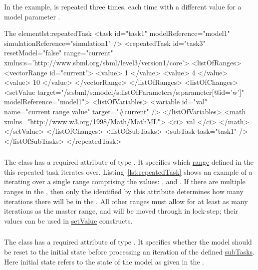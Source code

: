 In the example,  is repeated three times, each time with a different value for a model parameter .
\begin{myXmlLst}{The  element}{lst:repeatedTask}
<task id="task1" modelReference="model1" simulationReference="simulation1" />
<repeatedTask id="task3" resetModel="false" range="current"
    xmlns:s='http://www.sbml.org/sbml/level3/version1/core'>
  <listOfRanges>
    <vectorRange id="current"> 
        <value> 1 </value> 
        <value> 4 </value> 
        <value> 10 </value> 
    </vectorRange> 
  </listOfRanges>
  <listOfChanges>
     <setValue target="/s:sbml/s:model/s:listOfParameters/s:parameter[@id='w']" modelReference="model1">
       <listOfVariables> 
         <variable id="val" name="current range value" target="#current" /> 
       </listOfVariables> 
       <math xmlns="http://www.w3.org/1998/Math/MathML"> 
         <ci> val </ci> 
       </math> 
     </setValue> 
  </listOfChanges>
  <listOfSubTasks>
    <subTask task="task1" />
  </listOfSubTasks>
</repeatedTask>
\end{myXmlLst}
 
\subsubsection{}
\label{sec:rangeAttribute}
The  class has a required attribute  of type .
It specifies which \hyperref[sec:ranges]{range} defined in the  this repeated task iterates over.
Listing~\ref{lst:repeatedTask} shows an example of a  iterating over a single range comprising the values: ,  and .
If there are multiple ranges in the , then only the  identified by this attribute determines how many iterations there will be in the .
All other ranges must allow for at least as many iterations as the master range, and will be moved through in lock-step; their values can be used in \hyperref[class:setValue]{setValue} constructs.

\subsubsection{}
\label{sec:resetModel}
The  class has a required attribute  of type . It specifies whether the model should be reset to the initial state before processing an iteration of the defined \hyperref[class:subTask]{subTasks}. Here initial state refers to the state of the model as given in the .

